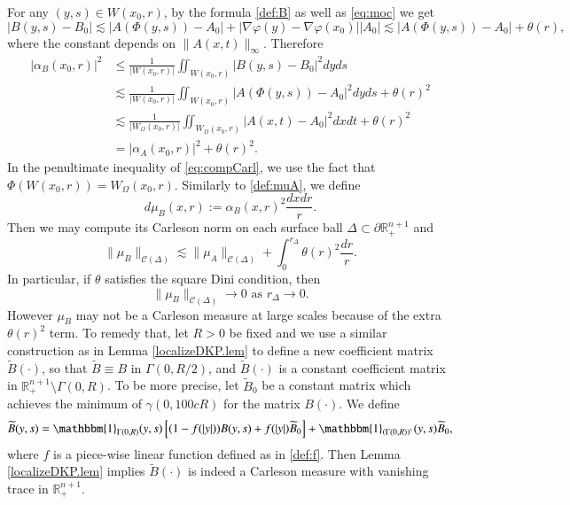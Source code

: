 \documentclass[11pt, a4paper,leqno]{amsart}
\theoremstyle{plain}
\theoremstyle{definition}
\theoremstyle{remark}
\numberwithin{equation}{section}
\newcommand{\RR}{{\mathbb{R}}}
\begin{document}
For any $(y,s) \in W(x_0,r)$, by the formula \eqref{def:B} as well as \eqref{eq:moc} we get
\[ \left| B(y,s) - B_0 \right| \lesssim |A(\Phi(y,s)) - A_0| + |\nabla \varphi(y) - \nabla \varphi(x_0) ||A_0| \lesssim |A(\Phi(y,s)) - A_0| + \theta(r), \]
where the constant depends on $\|A(x,t)\|_\infty$. Therefore
\begin{align}
	\left| \alpha_B(x_0,r) \right|^2 & \leq \frac{1}{|W(x_0,r)|} \iint_{W(x_0,r)} |B(y,s) - B_0|^2 dy ds \nonumber \\
	& \lesssim \frac{1}{|W(x_0,r)|} \iint_{W(x_0,r)} |A(\Phi(y,s)) - A_0|^2 dy ds + \theta(r)^2 \nonumber \\
	& \lesssim \frac{1}{|W_\Omega(x_0,r)|} \iint_{W_\Omega(x_0, r)} |A(x,t) - A_0|^2 dx dt + \theta(r)^2 \nonumber \\
	& = \left| \alpha_A(x_0, r) \right|^2 + \theta(r)^2.\label{eq:compCarl}
\end{align}
In the penultimate inequality of \eqref{eq:compCarl}, we use the fact that $\Phi(W(x_0,r)) = W_\Omega(x_0, r)$.
 Similarly to \eqref{def:muA}, we define
\[ d\mu_B(x,r) := \alpha_B(x,r)^2 \frac{dx dr}{r}. \] 
Then we may compute its Carleson norm on each surface ball $\Delta \subset \partial \RR^{n+1}_+$ and
\[ \|\mu_B\|_{\mathcal{C}(\Delta)} \lesssim \|\mu_A\|_{\mathcal{C}(\Delta)} + \int_0^{r_\Delta} \theta(r)^2 \frac{dr}{r}. \]
In particular, if $\theta$ satisfies the square Dini condition, 
then
\[ \|\mu_B\|_{\mathcal{C}(\Delta)} \to 0 \text{ as } r_\Delta \to 0. \]
However $\mu_B$ may not be a Carleson measure at large scales because of the extra $\theta(r)^2$ term. To remedy that, let $R>0$ be fixed
and we use a similar construction as in Lemma \ref{localizeDKP.lem} to define a new coefficient matrix $\widetilde{B}(\cdot)$, so that $\widetilde{B} \equiv B$ in $\Gamma(0,R/2)$, and $\widetilde{B}(\cdot)$ is a constant coefficient matrix in $\RR^{n+1}_+ \setminus \Gamma(0,R)$.
To be more precise, let $\widetilde{B}_0$ be a constant matrix which achieves the minimum of $\gamma(0, 100cR)$ for the matrix $B(\cdot)$. We define
\[ \widetilde{B}(y,s) = \mathbbm{1}_{\Gamma(0,R)}(y,s) \left[(1- f(|y|))B(y,s) + f(|y|)\widetilde{B}_0 \right] +\mathbbm{1}_{\left(\Gamma(0,R)\right)^c}(y,s) \widetilde{B}_0,  \]
where $f$ is a piece-wise linear function defined as in \eqref{def:f}.
Then Lemma \ref{localizeDKP.lem} implies $\widetilde{B}(\cdot)$ is indeed a Carleson measure with vanishing trace in $\RR^{n+1}_+$.
\end{document}
